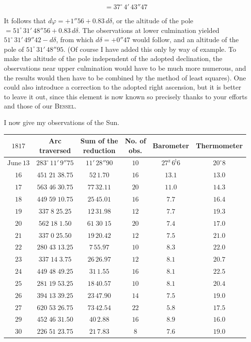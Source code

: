 \[ = 37^\circ\,4'\,43''47 \]

\par\indent It follows that $d\varphi = +1''56 + 0.83\,d\delta$, or the altitude of the pole $= 51^\circ\,31'\,48''56 + 0.83\,d\delta$. The observations at lower culmination yielded $51^\circ\,31'\,49''42 - d\delta$, from which $d\delta = +0''47$ would follow, and an altitude of the pole of $51^\circ\,31'\,48''95$. (Of course I have added this only by way of example. To make the altitude of the pole independent of the adopted declination, the observations near upper culmination would have to be much more numerous, and the results would then have to be combined by the method of least squares). One could also introduce a correction to the adopted right ascension, but it is better to leave it out, since this element is now known so precisely thanks to your efforts and those of our \textsc{Bessel}.

\par\indent I now give my observations of the Sun.

\begin{center}\fontsize{9}{11}\selectfont\setlength{\tabcolsep}{3pt}\begin{tabular}{c|c|c|c|c|c}
$1817$ & \shortstack{Arc\\traversed} & \shortstack{Sum of the\\reduction} & \shortstack{No. of\\obs.} & Barometer & Thermometer\\
\hline$\text{June}\ 13$ & $283^\circ\,11'\,9''75$ & $11'\,28''90$ & $10$ & $27^{\mathrm z}\,6^{\mathrm l}6$ & $20^\circ8$\\
$16$ & $451\;21\;38.75$ & $52\,1.70$ & $16$ & $13.1$ & $13.0$\\
$17$ & $563\;46\;30.75$ & $77\,32.11$ & $20$ & $11.0$ & $14.3$\\
$18$ & $449\;59\;10.75$ & $25\,45.01$ & $16$ & $7.7$ & $16.4$\\
$19$ & $337\;8\;25.25$ & $12\,31.98$ & $12$ & $7.7$ & $19.3$\\
$20$ & $562\;18\;1.50$ & $61\;30\;15$ & $20$ & $7.4$ & $17.0$\\
$21$ & $337\;0\;25.50$ & $19\,20.42$ & $12$ & $7.5$ & $21.0$\\
$22$ & $280\;43\;13.25$ & $7\,55.97$ & $10$ & $8.3$ & $22.0$\\
$23$ & $337\;14\;3.75$ & $26\,26.97$ & $12$ & $8.1$ & $20.7$\\
$24$ & $449\;48\;49.25$ & $31\,1.55$ & $16$ & $8.1$ & $22.5$\\
$25$ & $281\;19\;53.25$ & $18\,40.57$ & $10$ & $8.1$ & $20.4$\\
$26$ & $394\;13\;39.25$ & $23\,47.90$ & $14$ & $7.5$ & $19.0$\\
$27$ & $620\;53\;26.75$ & $73\,42.54$ & $22$ & $5.8$ & $17.5$\\
$29$ & $452\;46\;31.50$ & $40\,2.88$ & $16$ & $8.9$ & $16.0$\\
$30$ & $226\;51\;23.75$ & $21\,7.83$ & $8$ & $7.6$ & $19.0$\\
\end{tabular}\end{center}

